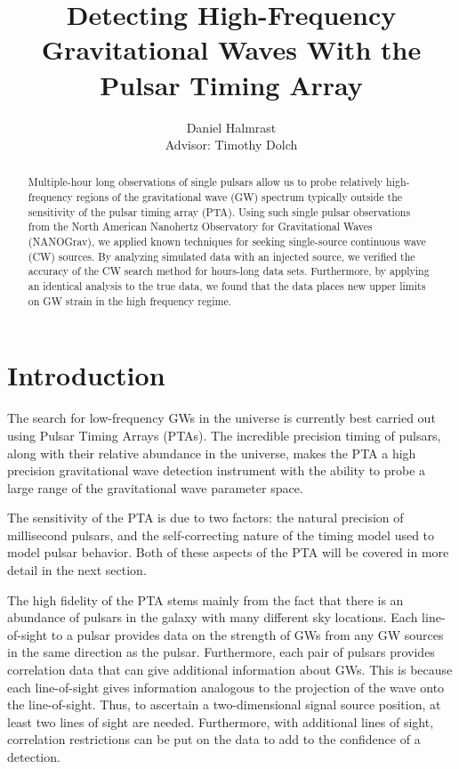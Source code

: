 \documentclass[12pt]{article}
\begin{document}
\bigskip

\title{Detecting High-Frequency Gravitational Waves With the Pulsar Timing Array}
\author{Daniel Halmrast \\ Advisor: Timothy Dolch}
\date{}

\maketitle

\begin{abstract}
Multiple-hour long observations of single pulsars allow us to probe relatively
high-frequency regions of the gravitational wave (GW) spectrum typically outside
the sensitivity of the pulsar timing array (PTA). Using such single pulsar
observations from the North American Nanohertz Observatory for Gravitational
Waves (NANOGrav), we applied known techniques for seeking single-source continuous
wave (CW) sources. By analyzing simulated data with an injected source, we
verified the accuracy of the CW search method for hours-long data sets.
Furthermore, by applying an identical analysis to the true data, we found that
the data places new upper limits on GW strain in the high frequency regime.
\end{abstract}

\section{Introduction}
The search for low-frequency GWs in the universe is currently
best carried out using Pulsar Timing Arrays (PTAs). The incredible precision timing of
pulsars, along with their relative abundance in the universe, makes the PTA a
high precision gravitational wave detection instrument with the ability to probe
a large range of the gravitational wave parameter space.

The sensitivity of the PTA is due to two factors: the natural precision of
millisecond pulsars, and the self-correcting nature of the timing model used to
model pulsar behavior. Both of these aspects of the PTA will be covered in more
detail in the next section.

The high fidelity of the PTA stems mainly from the fact that there is an
abundance of pulsars in the galaxy with many different sky locations.
Each line-of-sight to a pulsar provides data on the strength of
GWs from any GW sources in the same direction as the pulsar. Furthermore, each pair of
pulsars provides correlation data that can give additional information about GWs.
This is because each line-of-sight
gives information analogous to the projection of the wave onto the line-of-sight. Thus, to ascertain a two-dimensional signal source position, at least two
lines of sight are needed. Furthermore, with additional lines of sight,
correlation restrictions can be put on the data to add to the confidence of a
detection.
\end{document}
